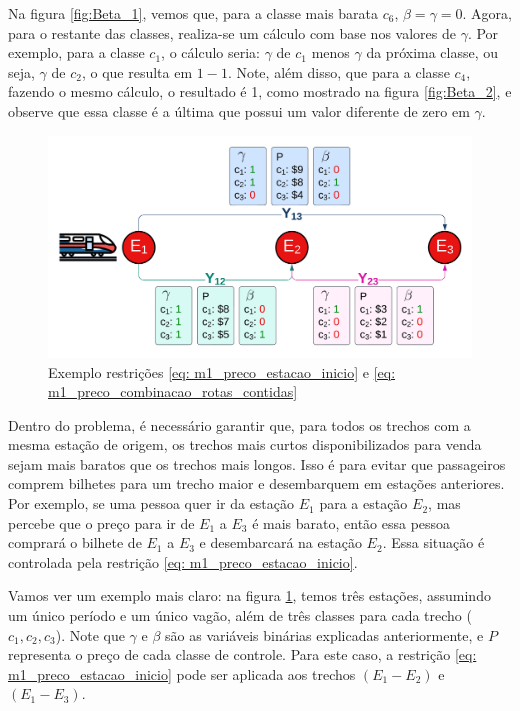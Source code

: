Na figura \ref{fig:Beta_1}, vemos que, para a classe mais barata $c_6$, $\beta=\gamma=0$. Agora, para o restante das classes, realiza-se um cálculo com base nos valores de $\gamma$. Por exemplo, para a classe $c_1$, o cálculo seria: $\gamma$ de $c_1$ menos $\gamma$ da próxima classe, ou seja, $\gamma$ de $c_2$, o que resulta em $1-1$. Note, além disso, que para a classe $c_4$, fazendo o mesmo cálculo, o resultado é 1, como mostrado na figura \ref{fig:Beta_2}, e observe que essa classe é a última que possui um valor diferente de zero em $\gamma$.


\begin{figure}[!ht]
	\begin{center}
		\includegraphics[scale=0.2]{img/fulfill.png}
		\caption{Exemplo restrições \ref{eq: m1_preco_estacao_inicio} e \ref{eq: m1_preco_combinacao_rotas_contidas}}
		\label{fig: fulfill}
	\end{center}
\end{figure}

Dentro do problema, é necessário garantir que, para todos os trechos com a mesma estação de origem, os trechos mais curtos disponibilizados para venda sejam mais baratos que os trechos mais longos. Isso é para evitar que passageiros comprem bilhetes para um trecho maior e desembarquem em estações anteriores. Por exemplo, se uma pessoa quer ir da estação $E_1$ para a estação $E_2$, mas percebe que o preço para ir de $E_1$ a $E_3$ é mais barato, então essa pessoa comprará o bilhete de $E_1$ a $E_3$ e desembarcará na estação $E_2$. Essa situação é controlada pela restrição \ref{eq: m1_preco_estacao_inicio}. 

Vamos ver um exemplo mais claro: na figura \ref{fig: fulfill}, temos três estações, assumindo um único período e um único vagão, além de três classes para cada trecho ($c_1, c_2, c_3$). Note que $\gamma$ e $\beta$ são as variáveis binárias explicadas anteriormente, e $P$ representa o preço de cada classe de controle. Para este caso, a restrição \ref{eq: m1_preco_estacao_inicio} pode ser aplicada aos trechos $(E_1-E_2)$ e $(E_1-E_3)$.

